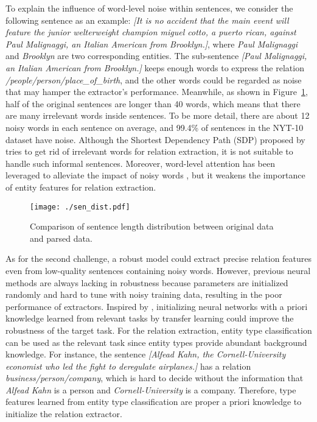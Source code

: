 \documentclass[11pt,a4paper]{article}
\begin{document}
  To explain the influence of word-level noise within sentences, we consider the following sentence as an example: \emph{[It is no accident that the main event will feature the junior welterweight champion miguel cotto, a puerto rican, against Paul Malignaggi, an Italian American from Brooklyn.]}, where \emph{Paul Malignaggi} and \emph{Brooklyn} are two corresponding entities. The sub-sentence \emph{[Paul Malignaggi, an Italian American from Brooklyn.]} keeps enough words to express the relation \emph{/people/person/place\_of\_birth}, and the other words could be regarded as noise that may hamper the extractor's performance. Meanwhile, as shown in Figure~\ref{fig:Sent_Dist}, half of the original sentences are longer than 40 words, which means that there are many irrelevant words inside sentences. To be more detail, there are about 12 noisy words in each sentence on average, and 99.4\% of sentences in the NYT-10 dataset have noise. Although the Shortest Dependency Path (SDP) proposed by \citet{xu2015classifying} tries to get rid of irrelevant words for relation extraction, it is not suitable to handle such informal sentences. Moreover, word-level attention has been leveraged to alleviate the impact of noisy words \citep{zhou2016attention}, but it weakens the importance of entity features for relation extraction.

  \begin{figure}[htbp]
    \centering
      \texttt{[image: ./sen\_dist.pdf]}
      \caption{Comparison of sentence length distribution between original data and parsed data.}
      \label{fig:Sent_Dist}
  \end{figure}

  As for the second challenge, a robust model could extract precise relation features even from low-quality sentences containing noisy words. However, previous neural methods are always lacking in robustness because parameters are initialized randomly and hard to tune with noisy training data, resulting in the poor performance of extractors. Inspired by \citet{kumagai2016learning}, initializing neural networks with a priori knowledge learned from relevant tasks by transfer learning could improve the robustness of the target task. For the relation extraction, entity type classification can be used as the relevant task since entity types provide abundant background knowledge. For instance, the sentence \emph{[Alfead Kahn, the Cornell-University economist who led the fight to deregulate airplanes.]} has a relation \emph{business/person/company}, which is hard to decide without the information that \emph{Alfead Kahn} is a person and \emph{Cornell-University} is a company. Therefore, type features learned from entity type classification are proper a priori knowledge to initialize the relation extractor.
\end{document}
